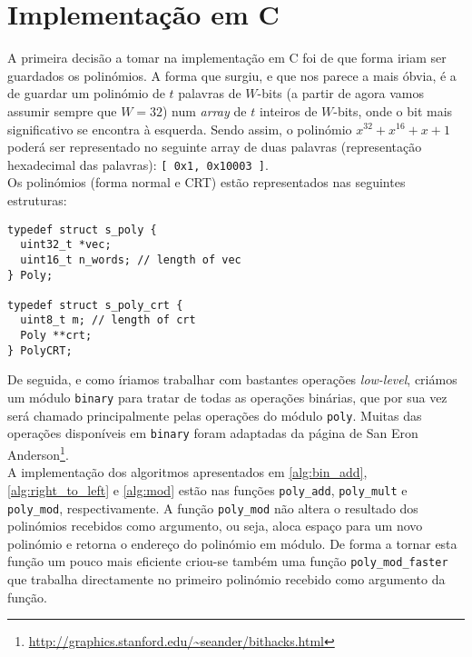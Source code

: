 \section{Implementação em \textsf{C}}
A primeira decisão a tomar na implementação em \textsf{C} foi de que forma iriam ser guardados os polinómios. A forma que surgiu, e que nos parece a mais óbvia, é a de guardar um polinómio de $t$ palavras de $W$-bits (a partir de agora vamos assumir sempre que $W = 32$) num \textit{array} de $t$ inteiros de $W$-bits, onde o bit mais significativo se encontra à esquerda. Sendo assim, o polinómio $x^{32} + x^{16} + x + 1$ poderá ser representado no seguinte array de duas palavras (representação hexadecimal das palavras): \verb|[ 0x1, 0x10003 ]|.\\
Os polinómios (forma normal e CRT) estão representados nas seguintes estruturas:
\begin{lstlisting}[style=C]
typedef struct s_poly {
  uint32_t *vec;
  uint16_t n_words; // length of vec
} Poly;

typedef struct s_poly_crt {
  uint8_t m; // length of crt
  Poly **crt;
} PolyCRT;
\end{lstlisting}
De seguida, e como íriamos trabalhar com bastantes operações \textit{low-level}, criámos um módulo \verb|binary| para tratar de todas as operações binárias, que por sua vez será chamado principalmente pelas operações do módulo \verb|poly|. Muitas das operações disponíveis em \verb|binary| foram adaptadas da página de San Eron Anderson\footnote{\url{http://graphics.stanford.edu/~seander/bithacks.html}}.\\
A implementação dos algoritmos apresentados em \ref{alg:bin_add}, \ref{alg:right_to_left} e \ref{alg:mod} estão nas funções \verb|poly_add|, \verb|poly_mult| e \verb|poly_mod|, respectivamente. A função \verb|poly_mod| não altera o resultado dos polinómios recebidos como argumento, ou seja, aloca espaço para um novo polinómio e retorna o endereço do polinómio em módulo. De forma a tornar esta função um pouco mais eficiente criou-se também uma função \verb|poly_mod_faster| que trabalha directamente no primeiro polinómio recebido como argumento da função.

